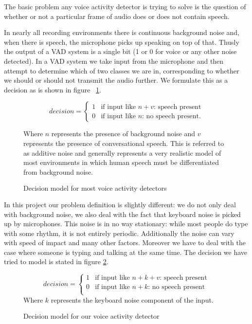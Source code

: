 \documentclass[ %
                    author={Sam Phippen},
                supervisor={Dr. Rafal Bogacz},
                     title={Real time voice activity detectors in noisy personal computing environments},
                  subtitle={},
                    degree={MEng},
                      year={2012} ]{thesis}
\begin{document}
The basic problem any voice activity detector is trying to solve is the
question of whether or not a particular frame of audio does or does not contain
speech.

In nearly all recording environments there is continuous background noise and,
when there is speech, the microphone picks up speaking on top of that. Thusly
the output of a VAD system is a single bit (1 or 0 for voice or any other noise
detected). In a VAD system we take input from the microphone and then attempt
to determine which of two classes we are in, corresponding to whether we
should or should not transmit the audio further. We formulate this as a
decision as is shown in figure ~\ref{fig:decision1}.

\begin{figure}
        \[ decision = \left\{ \begin{array}{ll}
                    1 & \mbox{if input like $n + v$: speech present}\\
            0 & \mbox{if input like $n$: no speech present}.\end{array} \right. \]


                    Where $n$ represents the presence of background noise and $v$ represents the
                    presence of conversational speech. This is referred to as additive
                    noise\cite{sohn} and generally represents a very realistic model of most
                    environments in which human speech must be differentiated from background noise.

                    \caption{Decision model for most voice activity detectors}
                    \label{fig:decision1}

\end{figure}


In this project our problem definition is slightly different: we do not only
deal with background noise, we also deal with the fact that keyboard noise is
picked up by microphones. This noise is in no way stationary: while most people
do type with some rhythm, it is not entirely periodic. Additionally the noise
can vary with speed of impact and many other factors. Moreover we have
to deal with the case where someone is typing and talking at the same time.
The decision we have tried to model is stated in  figure \ref{eqn:decision 2}.

\begin{figure}
\[ decision = \left\{ \begin{array}{ll}
            1 & \mbox{if input like $n + k + v$: speech present}\\
            0 & \mbox{if input like $n + k$: no speech present}\\

    \end{array} \right. \]
            Where $k$ represents the keyboard noise component of the input.
            \caption{Decision model for our voice activity detector}
            \label{eqn:decision 2}
\end{figure}
\end{document}
